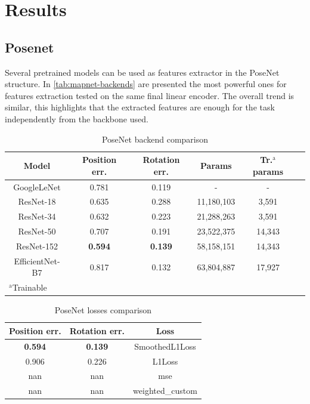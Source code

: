\section{Results}
\subsection{Posenet}
Several pretrained models can be used as features extractor in the PoseNet structure. In \cref{tab:mapnet-backends} are presented the most powerful ones for features extraction tested on the same final linear encoder. The overall trend is similar, this highlights that the extracted features are enough for the task independently from the backbone used.
\begin{table}[htbp]
\caption{PoseNet backend comparison}
\begin{center}
\begin{tabular}{|c|c|c|c|c|c|}
\hline
\textbf{Model}&\textbf{Position err.}&\textbf{Rotation err.}&\textbf{Params}&\textbf{Tr.$^{\mathrm{a}}$ params} \\
\hline
GoogleLeNet     &0.781         &0.119         &-         &-      \\
ResNet-18       &0.635         &0.288         &11,180,103&3,591  \\
ResNet-34       &0.632         &0.223         &21,288,263&3,591  \\
ResNet-50       &0.707         &0.191         &23,522,375&14,343 \\
ResNet-152      &\textbf{0.594}&\textbf{0.139}&58,158,151&14,343 \\
EfficientNet-B7 &0.817         &0.132         &63,804,887&17,927 \\
\hline
\multicolumn{4}{l}{$^{\mathrm{a}}$Trainable}
\end{tabular}
\label{tab:posenet-backends}
\end{center}
\end{table}

\begin{table}[htbp]
\caption{PoseNet losses comparison}
\begin{center}
\begin{tabular}{|c|c|c|}
\hline
\textbf{Position err.}&\textbf{Rotation err.}&\textbf{Loss} \\
\hline
\textbf{0.594}&\textbf{0.139}&SmoothedL1Loss   \\
0.906         &0.226       &L1Loss           \\
nan           &nan         &mse              \\
nan           &nan         &weighted\_custom \\
\hline
\end{tabular}
\label{tab:posenet-backends}
\end{center}
\end{table}

